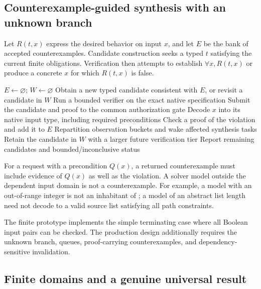 \subsection{Counterexample-guided synthesis with an unknown branch}

Let $R(t,x)$ express the desired behavior on input $x$, and let $E$ be the bank of accepted counterexamples. Candidate construction seeks a typed $t$ satisfying the current finite obligations. Verification then attempts to establish $\forall x, R(t,x)$ or produce a concrete $x$ for which $R(t,x)$ is false.

\begin{algorithm}[ht]
\caption{Fair CEGIS with proof-producing acceptance}
\label{alg:cegis}
\begin{algorithmic}[1]
\State $E\gets\varnothing$; $W\gets\varnothing$ 
 \State Obtain a new typed candidate consistent with $E$, or revisit a candidate in $W$
 \State Run a bounded verifier on the exact native specification
   \State Submit the candidate and proof to the common authorization gate
   \State Decode $x$ into its native input type, including required preconditions
   \State Check a proof of the violation and add it to $E$
   \State Repartition observation buckets and wake affected synthesis tasks
 \Else
   \State Retain the candidate in $W$ with a larger future verification tier
 \EndIf
\EndWhile
\State Report remaining candidates and bounded/inconclusive status
\end{algorithmic}
\end{algorithm}

For a request with a precondition $Q(x)$, a returned counterexample must include evidence of $Q(x)$ as well as the violation. A solver model outside the dependent input domain is not a counterexample. For example, a model with an out-of-range integer is not an inhabitant of ; a model of an abstract list length need not decode to a valid source list satisfying all path constraints.

The finite prototype implements the simple terminating case where all Boolean input pairs can be checked. The production design additionally requires the unknown branch, queues, proof-carrying counterexamples, and dependency-sensitive invalidation.

\subsection{Finite domains and a genuine universal result}

